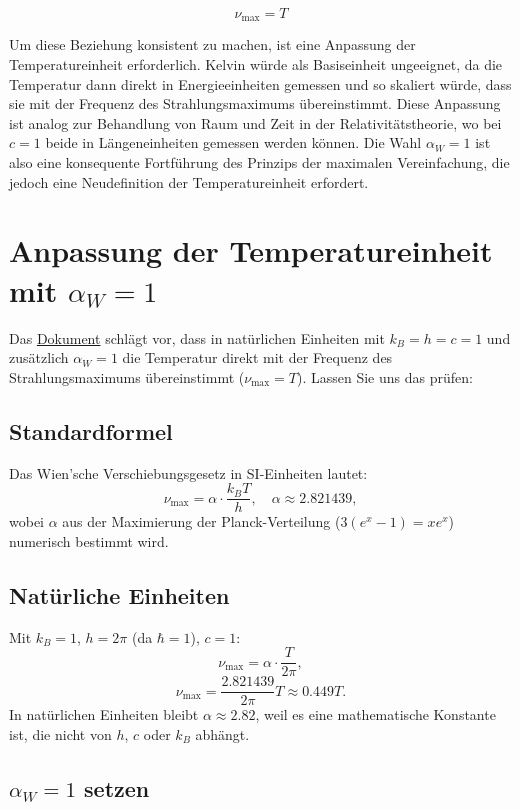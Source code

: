 \documentclass[12pt,a4paper]{article}
\begin{document}
	\begin{equation}
		\nu_{\text{max}} = T
	\end{equation}
	
	Um diese Beziehung konsistent zu machen, ist eine Anpassung der Temperatureinheit erforderlich. Kelvin würde als Basiseinheit ungeeignet, da die Temperatur dann direkt in Energieeinheiten gemessen und so skaliert würde, dass sie mit der Frequenz des Strahlungsmaximums übereinstimmt. Diese Anpassung ist analog zur Behandlung von Raum und Zeit in der Relativitätstheorie, wo bei $c = 1$ beide in Längeneinheiten gemessen werden können. Die Wahl $\alpha_W = 1$ ist also eine konsequente Fortführung des Prinzips der maximalen Vereinfachung, die jedoch eine Neudefinition der Temperatureinheit erfordert.
	\section{Anpassung der Temperatureinheit mit $\alpha_W = 1$}
	
	Das \href{https://github.com/jpascher/T0-Time-Mass-Duality/tree/main/2/pdf/Deutsch/Natürliche Einheiten mit Feinstrukturkonstante alpha = 1.pdf}{Dokument} schlägt vor, dass in natürlichen Einheiten mit $k_B = h = c = 1$ und zusätzlich $\alpha_W = 1$ die Temperatur direkt mit der Frequenz des Strahlungsmaximums übereinstimmt ($\nu_{\text{max}} = T$). Lassen Sie uns das prüfen:
	
	\subsection{Standardformel}
	
	Das Wien’sche Verschiebungsgesetz in SI-Einheiten lautet:
	\[
	\nu_{\text{max}} = \alpha \cdot \frac{k_B T}{h}, \quad \alpha \approx 2.821439,
	\]
	wobei $\alpha$ aus der Maximierung der Planck-Verteilung ($3 (e^x - 1) = x e^x$) numerisch bestimmt wird.
	\subsection{Natürliche Einheiten}
	
	Mit $k_B = 1$, $h = 2\pi$ (da $\hbar = 1$), $c = 1$:
	\[
	\nu_{\text{max}} = \alpha \cdot \frac{T}{2\pi},
	\]
	\[
	\nu_{\text{max}} = \frac{2.821439}{2\pi} T \approx 0.449 T.
	\]
	In natürlichen Einheiten bleibt $\alpha \approx 2.82$, weil es eine mathematische Konstante ist, die nicht von $h$, $c$ oder $k_B$ abhängt.
	\subsection{$\alpha_W = 1$ setzen}
	
\end{document}
